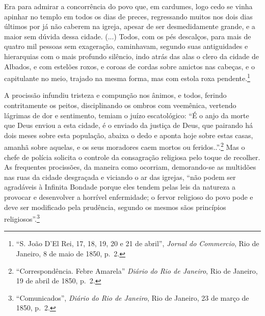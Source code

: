 Era para admirar a concorrência do povo que, em cardumes, logo cedo se
vinha apinhar no templo em todos os dias de preces, regressando muitos
nos dois dias últimos por já não caberem na igreja, apesar de ser
desmedidamente grande, e a maior sem dúvida dessa cidade. (...) Todos,
com os pés descalços, para mais de quatro mil pessoas sem exageração,
caminhavam, segundo suas antiguidades e hierarquias com o mais profundo
silêncio, indo atrás das alas o clero da cidade de Albados, e com
estelões roxos, e coroas de cordas sobre amictos nas cabeças, e o
capitulante no meio, trajado na mesma forma, mas com estola roxa
pendente.\footnote{``S. João D'El Rei, 17, 18, 19, 20 e 21 de abril'',
  \emph{Jornal do Commercio}, Rio de Janeiro, 8 de maio de 1850, p.~2.}

A procissão infundiu tristeza e compunção nos ânimos, e todos, ferindo
contritamente os peitos, disciplinando os ombros com veemênica, vertendo
lágrimas de dor e sentimento, temiam o juízo escatológico: ``É o anjo da
morte que Deus enviou a esta cidade, é o enviado da justiça de Deus, que
pairando há dois meses sobre esta população, abaixa o dedo e aponta hoje
sobre estas casas, amanhã sobre aquelas, e os seus moradores caem mortos
ou feridos..''.\footnote{``Correspondência. Febre Amarela'' \emph{Diário
  do Rio de Janeiro}, Rio de Janeiro, 19 de abril de 1850, p.~2.} Mas o
chefe de polícia solicita o controle da consagração religiosa pelo toque
de recolher. As frequentes procissões, da maneira como ocorriam,
demorando-se as multidões nas ruas da cidade desgraçada e viciando o ar
das igrejas, ``não podem ser agradáveis à Infinita Bondade porque eles
tendem pelas leis da natureza a provocar e desenvolver a horrível
enfermidade; o fervor religioso do povo pode e deve ser modificado pela
prudência, segundo os mesmos sãos princípios religiosos''.\footnote{``Comunicados'',
  \emph{Diário do Rio de Janeiro}, Rio de Janeiro, 23 de março de 1850,
  p.~2.}

